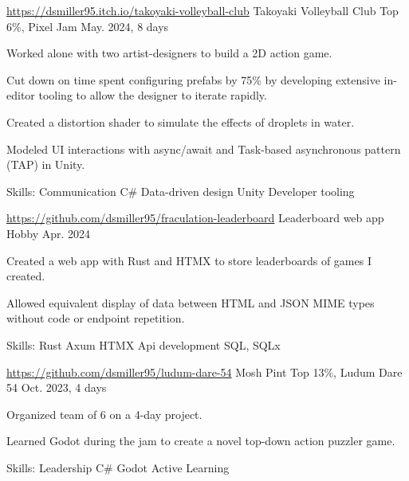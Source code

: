 \begin{cventries}
  \cventry
 {\href{https://dsmiller95.itch.io/takoyaki-volleyball-club}{https://dsmiller95.itch.io/takoyaki-volleyball-club}} %
 {Takoyaki Volleyball Club} %
 {Top 6\%, Pixel Jam} %
 {May. 2024, 8 days} %
 {
      \begin{cvitems} %
        \item {Worked alone with two artist-designers to build a 2D action game.}
        \item {Cut down on time spent configuring prefabs by 75\% by developing extensive in-editor tooling to allow the designer to iterate rapidly.}
        \item {Created a distortion shader to simulate the effects of droplets in water.}
        \item {Modeled UI interactions with async/await and Task-based asynchronous pattern (TAP) in Unity.}
        \item {Skills: Communication \textbullet{} C\# \textbullet{} Data-driven design \textbullet{} Unity \textbullet{} Developer tooling }
      \end{cvitems}
 }


 \cventry
 {\href{https://github.com/dsmiller95/fraculation-leaderboard}{https://github.com/dsmiller95/fraculation-leaderboard}} %
 {Leaderboard web app} %
 {Hobby} %
 {Apr. 2024} %
 {
     \begin{cvitems} %
      \item {Created a web app with Rust and HTMX to store leaderboards of games I created.}
      \item {Allowed equivalent display of data between HTML and JSON MIME types without code or endpoint repetition.}
      \item {Skills: Rust \textbullet{} Axum \textbullet{} HTMX \textbullet{} Api development \textbullet{} SQL, SQLx }
     \end{cvitems}
 }

  \cventry
 {\href{https://github.com/dsmiller95/ludum-dare-54}{https://github.com/dsmiller95/ludum-dare-54}} %
 {Mosh Pint} %
 {Top 13\%, Ludum Dare 54} %
 {Oct. 2023, 4 days} %
 {
      \begin{cvitems} %
        \item {Organized team of 6 on a 4-day project.}
        \item {Learned Godot during the jam to create a novel top-down action puzzler game.}
        \item {Skills: Leadership \textbullet{} C\# \textbullet{} Godot \textbullet{} Active Learning}
      \end{cvitems}
 }


\end{cventries}
